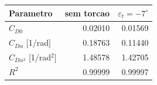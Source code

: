 \begin{tabular}{lrr}
\toprule
Parametro & sem torcao & $\varepsilon_t=-7^\circ$ \\
\midrule
$C_{D0}$ & 0.02010 & 0.01569 \\
$C_{D\alpha}$ [1/rad] & 0.18763 & 0.11440 \\
$C_{D\alpha^2}$ [1/rad$^2$] & 1.48578 & 1.42705 \\
$R^2$ & 0.99999 & 0.99997 \\
\bottomrule
\end{tabular}
